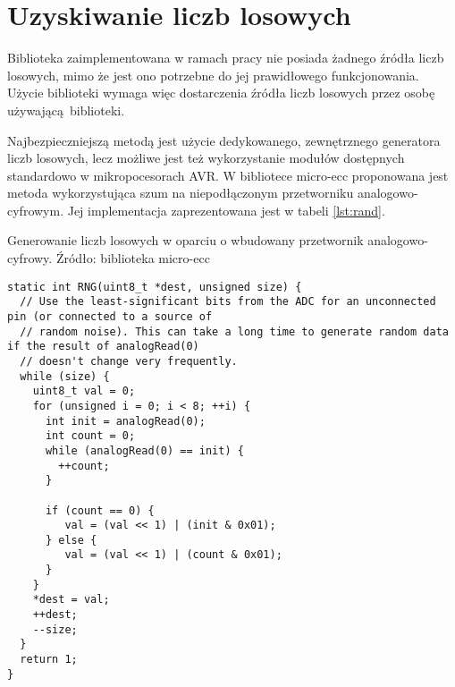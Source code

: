 \chapter{Uzyskiwanie liczb losowych}
\label{app:randgen}



Biblioteka zaimplementowana w ramach pracy nie posiada żadnego źródła liczb losowych, mimo że jest ono potrzebne do jej prawidłowego funkcjonowania. Użycie biblioteki wymaga więc dostarczenia źródła liczb losowych przez osobę używającą biblioteki.

Najbezpieczniejszą metodą jest użycie dedykowanego, zewnętrznego generatora liczb losowych, lecz możliwe jest też wykorzystanie modułów dostępnych standardowo w mikropocesorach AVR. W bibliotece micro-ecc proponowana jest metoda wykorzystująca szum na niepodłączonym przetworniku analogowo-cyfrowym. Jej implementacja zaprezentowana jest w tabeli \ref{lst:rand}.

\begin{table}[!htb]
\caption{Generowanie liczb losowych w oparciu o wbudowany przetwornik analogowo-cyfrowy. Źródło: biblioteka micro-ecc}
\label{lst:rand}
\begin{lstlisting}
static int RNG(uint8_t *dest, unsigned size) {
  // Use the least-significant bits from the ADC for an unconnected pin (or connected to a source of 
  // random noise). This can take a long time to generate random data if the result of analogRead(0) 
  // doesn't change very frequently.
  while (size) {
    uint8_t val = 0;
    for (unsigned i = 0; i < 8; ++i) {
      int init = analogRead(0);
      int count = 0;
      while (analogRead(0) == init) {
        ++count;
      }
      
      if (count == 0) {
         val = (val << 1) | (init & 0x01);
      } else {
         val = (val << 1) | (count & 0x01);
      }
    }
    *dest = val;
    ++dest;
    --size;
  }
  return 1;
}
\end{lstlisting}
\end{table}
